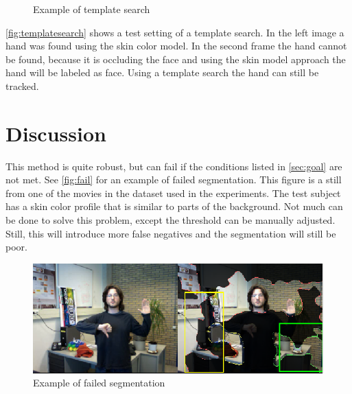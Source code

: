 \begin{figure}[tb]
\begin{center}
\hspace{0.03\linewidth}
\end{center}
\caption{Example of template search}
\label{fig:templatesearch}
\end{figure}

\autoref{fig:templatesearch} shows a test setting of a template search. In the left image a hand was found using the skin color model. In the second frame the hand cannot be found, because it is occluding the face and using the skin model approach the hand will be labeled as face. Using a template search the hand can still be tracked.


\section{Discussion}
This method is quite robust, but can fail if the conditions listed in \autoref{sec:goal} are not met. See \autoref{fig:fail} for an example of failed segmentation. This figure is a still from one of the movies in the dataset used in the experiments. The test subject has a skin color profile that is similar to parts of the background. Not much can be done to solve this problem, except the threshold can be manually adjusted. Still, this will introduce more false negatives and the segmentation will still be poor.

\begin{figure}[tb]
\center{}
\includegraphics[width=0.8\linewidth]{figures/fail.png}
\caption{Example of failed segmentation}
\label{fig:fail}
\end{figure}

